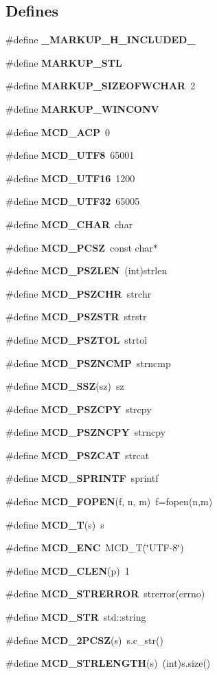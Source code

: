 \subsection*{Defines}
\begin{CompactItemize}
\item 
\#define {\bf \_\-MARKUP\_\-H\_\-INCLUDED\_\-}
\item 
\#define {\bf MARKUP\_\-STL}
\item 
\#define {\bf MARKUP\_\-SIZEOFWCHAR}~2
\item 
\#define {\bf MARKUP\_\-WINCONV}
\item 
\#define {\bf MCD\_\-ACP}~0
\item 
\#define {\bf MCD\_\-UTF8}~65001
\item 
\#define {\bf MCD\_\-UTF16}~1200
\item 
\#define {\bf MCD\_\-UTF32}~65005
\item 
\#define {\bf MCD\_\-CHAR}~char
\item 
\#define {\bf MCD\_\-PCSZ}~const char$\ast$
\item 
\#define {\bf MCD\_\-PSZLEN}~(int)strlen
\item 
\#define {\bf MCD\_\-PSZCHR}~strchr
\item 
\#define {\bf MCD\_\-PSZSTR}~strstr
\item 
\#define {\bf MCD\_\-PSZTOL}~strtol
\item 
\#define {\bf MCD\_\-PSZNCMP}~strncmp
\item 
\#define {\bf MCD\_\-SSZ}(sz)~sz
\item 
\#define {\bf MCD\_\-PSZCPY}~strcpy
\item 
\#define {\bf MCD\_\-PSZNCPY}~strncpy
\item 
\#define {\bf MCD\_\-PSZCAT}~strcat
\item 
\#define {\bf MCD\_\-SPRINTF}~sprintf
\item 
\#define {\bf MCD\_\-FOPEN}(f, n, m)~f=fopen(n,m)
\item 
\#define {\bf MCD\_\-T}(s)~s
\item 
\#define {\bf MCD\_\-ENC}~MCD\_\-T(\char`\"{}UTF-8\char`\"{})
\item 
\#define {\bf MCD\_\-CLEN}(p)~1
\item 
\#define {\bf MCD\_\-STRERROR}~strerror(errno)
\item 
\#define {\bf MCD\_\-STR}~std::string
\item 
\#define {\bf MCD\_\-2PCSZ}(s)~s.c\_\-str()
\item 
\#define {\bf MCD\_\-STRLENGTH}(s)~(int)s.size()

\end{CompactItemize}
